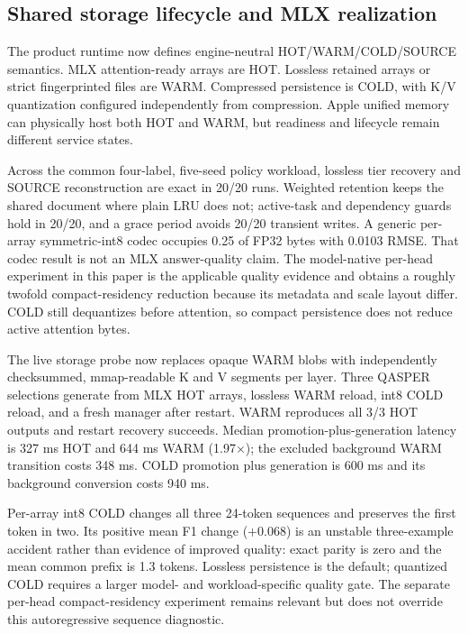\documentclass[10pt]{article}
\begin{document}
\subsection{Shared storage lifecycle and MLX realization}
The product runtime now defines engine-neutral HOT/WARM/COLD/SOURCE semantics.
MLX attention-ready arrays are HOT. Lossless retained arrays or strict
fingerprinted files are WARM. Compressed persistence is COLD, with K/V
quantization configured independently from compression. Apple unified memory
can physically host both HOT and WARM, but readiness and lifecycle remain
different service states.

Across the common four-label, five-seed policy workload, lossless tier recovery
and SOURCE reconstruction are exact in 20/20 runs. Weighted retention keeps the
shared document where plain LRU does not; active-task and dependency guards hold
in 20/20, and a grace period avoids 20/20 transient writes. A generic
per-array symmetric-int8 codec occupies 0.25 of FP32 bytes with 0.0103 RMSE.
That codec result is not an MLX answer-quality claim. The model-native per-head
experiment in this paper is the applicable quality evidence and obtains a
roughly twofold compact-residency reduction because its metadata and scale
layout differ. COLD still dequantizes before attention, so compact persistence
does not reduce active attention bytes.

The live storage probe now replaces opaque WARM blobs with independently
checksummed, mmap-readable K and V segments per layer. Three QASPER selections
generate from MLX HOT arrays, lossless WARM reload, int8 COLD reload, and a
fresh manager after restart. WARM reproduces all 3/3 HOT outputs and restart
recovery succeeds. Median promotion-plus-generation latency is 327 ms HOT and
644 ms WARM (1.97$\times$); the excluded background WARM transition costs
348 ms. COLD promotion plus generation is 600 ms and its background conversion
costs 940 ms.

\begin{table}[!htbp]
\centering
\scriptsize
\caption{Shared three-example live storage probe. Prefix is mean HOT/int8
common output prefix; ratios use lifecycle-inclusive request latency.}
\resizebox{\linewidth}{!}{%
}
\label{tab:mlx-live-storage}
\end{table}

Per-array int8 COLD changes all three 24-token sequences and preserves the
first token in two. Its positive mean F1 change ($+0.068$) is an unstable
three-example accident rather than evidence of improved quality: exact parity
is zero and the mean common prefix is 1.3 tokens. Lossless persistence is the
default; quantized COLD requires a larger model- and workload-specific quality
gate. The separate per-head compact-residency experiment remains relevant but
does not override this autoregressive sequence diagnostic.
\end{document}

